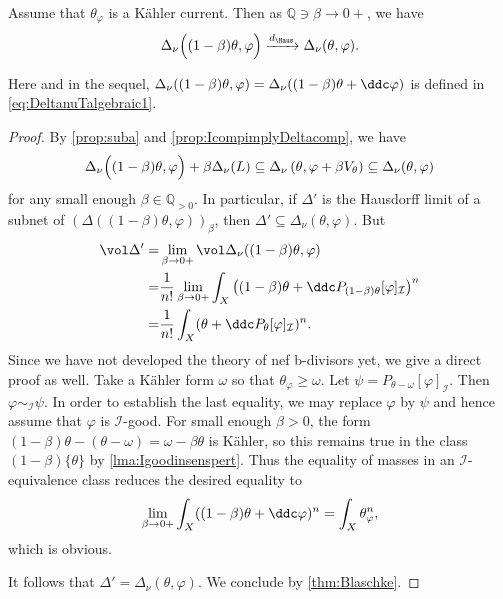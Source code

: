 \begin{lemma}\label{lma:Hausconvbetato0}
    Assume that $\theta_{\varphi}$ is a Kähler current. Then as $\mathbb{Q}\ni\beta\to 0+$, we have
    \[
        \Delta_{\nu}\Bigl((1-\beta)\theta,\varphi\Bigr)\xrightarrow{d_{\Haus}} \Delta_{\nu}(\theta,\varphi).
    \]
\end{lemma}
Here and in the sequel, $\Delta_{\nu}((1-\beta)\theta,\varphi)=\Delta_{\nu}((1-\beta)\theta+\ddc\varphi)$ is defined in \eqref{eq:DeltanuTalgebraic1}.
\begin{proof}
    By \cref{prop:suba} and \cref{prop:IcompimplyDeltacomp}, we have
    \[
        \Delta_{\nu}\Bigl((1-\beta)\theta,\varphi\Bigr)+\beta\Delta_{\nu}(L)\subseteq \Delta_\nu\left(\theta,\varphi+\beta V_\theta\right)\subseteq \Delta_{\nu}(\theta,\varphi)
    \]
    for any small enough $\beta\in \mathbb{Q}_{>0}$.
    In particular, if $\Delta'$ is the Hausdorff limit of a subnet of $(\Delta((1-\beta)\theta,\varphi))_{\beta}$, then $\Delta'\subseteq \Delta_{\nu}(\theta,\varphi)$.
    But
    \[
    \begin{split}
        \vol \Delta'=&\lim_{\beta\to 0+}\vol \Delta_{\nu}((1-\beta)\theta,\varphi)\\
        =&\frac{1}{n!}\lim_{\beta\to 0+}\int_X \left((1-\beta)\theta+\ddc P_{(1-\beta)\theta}[\varphi]_{\mathcal{I}}\right)^n\\
        =&\frac{1}{n!}\int_X (\theta+\ddc P_{\theta}[\varphi]_{\mathcal{I}})^n.
    \end{split}
    \]
    Since we have not developed the theory of nef b-divisors yet, we give a direct proof as well. Take a Kähler form $\omega$ so that $\theta_{\varphi}\geq \omega$. Let $\psi=P_{\theta-\omega}[\varphi]_{\mathcal{I}}$. Then $\varphi\sim_{\mathcal{I}}\psi$. In order to establish the last equality, we may replace $\varphi$ by $\psi$ and hence assume that $\varphi$ is $\mathcal{I}$-good. For small enough $\beta>0$, the form $(1-\beta)\theta-(\theta-\omega)=\omega-\beta\theta$ is Kähler, so this remains true in the class $(1-\beta)\{\theta\}$ by \cref{lma:Igoodinsenspert}. Thus the equality of masses in an $\mathcal{I}$-equivalence class reduces the desired equality to
    \[
    \lim_{\beta\to 0+}\int_X ((1-\beta)\theta+\ddc \varphi)^n=\int_X \theta_{\varphi}^n,
    \]
    which is obvious.

    It follows that $\Delta'=\Delta_{\nu}(\theta,\varphi)$. We conclude by \cref{thm:Blaschke}.
\end{proof}



